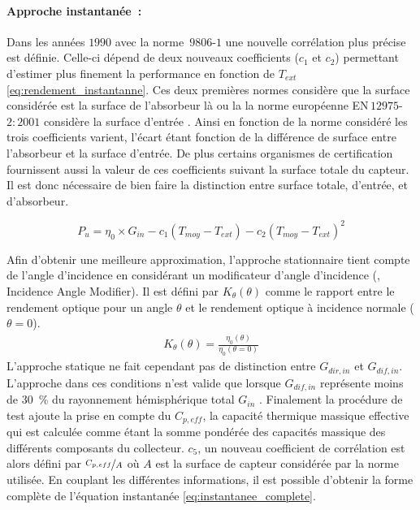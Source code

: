 \paragraph{Approche instantanée~:} %
\label{par:approche_instantanée}
Dans les années $1990$ avec la norme \,$9806$-$1$ une nouvelle corrélation plus précise est définie. Celle-ci
dépend de deux nouveaux coefficients ($c_{1}$ et $c_{2}$) permettant d’estimer plus
finement la performance en fonction de $T_{ext}$ \eqref{eq:rendement_instantanne}.
Ces deux premières normes considère que la surface considérée est la surface de l’absorbeur là ou la
la norme européenne EN\,$12975$-$2:2001$ considère la surface d’entrée \parencite{EN1297522001}.
Ainsi en fonction de la norme considéré les trois coefficients varient, l’écart étant
fonction de la différence de surface entre l’absorbeur et la surface d’entrée.
De plus certains organismes de certification fournissent aussi la valeur de ces coefficients suivant la
surface totale du capteur. Il est donc nécessaire de bien faire la distinction entre
surface totale, d’entrée, et d’absorbeur.

\begin{equation}\label{eq:rendement_instantanne}
    P_{u} = \eta_{0} \times G_{in}- c_{1} (T_{moy} - T_{ext}) - c_{2} (T_{moy} - T_{ext})^{2}
\end{equation}

Afin d’obtenir une meilleure approximation, l’approche stationnaire tient compte
de l’angle d’incidence en considérant un modificateur d’angle d’incidence (, Incidence Angle Modifier).
Il est défini par $K_{\theta}(\theta)$ comme le rapport entre le rendement optique pour un angle $\theta$
et le rendement optique à incidence normale ($\theta = 0$).
\begin{equation}\label{eq:IAM}
    \begin{aligned}
    K_{\theta}(\theta) = \frac{\eta_{0}(\theta)}{\eta_{0}(\theta = 0)}
    \end{aligned}
\end{equation}
L’approche statique ne fait cependant pas de distinction entre $G_{dir, in}$ et $G_{dif, in}$.
L’approche dans ces conditions n’est valide que lorsque $G_{dif, in}$ représente moins de
\SI{30}{\percent} du rayonnement hémisphérique total $G_{in}$ \parencite{Osorio2014}.
Finalement la procédure de test ajoute la prise en compte du $C_{p, eff}$, la capacité thermique
massique effective qui est calculée comme étant la somme pondérée des capacités
massique des différents composants du collecteur. $c_{5}$, un nouveau coefficient de corrélation
est alors défini par $\nicefrac{C_{p, eff}}{A}$ où $A$ est la surface
de capteur considérée par la norme utilisée.
En couplant les différentes informations, il est possible d’obtenir la forme
complète de l’équation instantanée \eqref{eq:instantanee_complete}.

